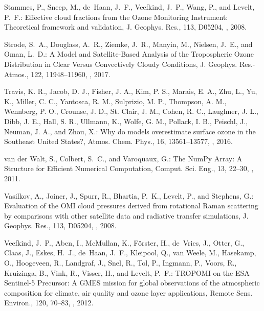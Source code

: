 \documentclass[amt]{copernicus}
\begin{document}
\begin{thebibliography}{105}
Stammes, P., Sneep, M., de~Haan, J.~F., Veefkind, J.~P., Wang, P., and Levelt,
  P.~F.: Effective cloud fractions from the Ozone Monitoring Instrument:
  Theoretical framework and validation, J. Geophys. Res., 113,
  D05204, , 2008.

Strode, S.~A., Douglass, A.~R., Ziemke, J.~R., Manyin, M., Nielsen, J.~E., and
  Oman, L.~D.: A Model and Satellite-Based Analysis of the Tropospheric Ozone
  Distribution in Clear Versus Convectively Cloudy Conditions, J. Geophys. Res.-Atmos., 122, 11948--11960,
  , 2017.

Travis, K. R., Jacob, D. J., Fisher, J. A., Kim, P. S., Marais, E. A., Zhu, L., Yu, K., Miller, C. C., Yantosca, R. M., Sulprizio, M. P., Thompson, A. M., Wennberg, P. O., Crounse, J. D., St. Clair, J. M., Cohen, R. C., Laughner, J. L., Dibb, J. E., Hall, S. R., Ullmann, K., Wolfe, G. M., Pollack, I. B., Peischl, J., Neuman, J. A., and Zhou, X.: Why do models overestimate surface ozone in the Southeast United States?, Atmos. Chem. Phys., 16, 13561–13577, , 2016.

{van der Walt}, S., Colbert, S.~C., and Varoquaux, G.: The NumPy Array: A
  Structure for Efficient Numerical Computation, Comput. Sci. Eng., 13, 22--30, , 2011.

Vasilkov, A., Joiner, J., Spurr, R., Bhartia, P.~K., Levelt, P., and Stephens,
  G.: Evaluation of the OMI cloud pressures derived from rotational Raman
  scattering by comparisons with other satellite data and radiative transfer
  simulations, J. Geophys. Res., 113, D05204,
  , 2008.

Veefkind, J.~P., Aben, I., McMullan, K., Förster, H., de~Vries, J., Otter, G.,
  Claas, J., Eskes, H.~J., de~Haan, J.~F., Kleipool, Q., {van Weele}, M.,
  Hasekamp, O., Hoogeveen, R., Landgraf, J., Snel, R., Tol, P., Ingmann, P.,
  Voors, R., Kruizinga, B., Vink, R., Visser, H., and Levelt, P.~F.: TROPOMI on
  the ESA Sentinel-5 Precursor: A GMES mission for global observations of the
  atmospheric composition for climate, air quality and ozone layer
  applications, Remote Sens. Environ., 120, 70--83,
  , 2012.


\end{thebibliography}
\end{document}
